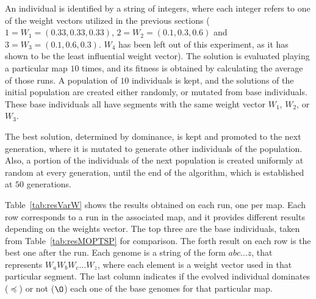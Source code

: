 \documentclass[journal]{IEEEtran}
\begin{document}
An individual is identified by a string of integers, where each integer refers to one of the weight vectors utilized in the previous sections ( $1 = W_1 = (0.33,0.33,0.33)$, $2 = W_2 = (0.1,0.3,0.6)$ and $3 = W_3 = (0.1,0.6,0.3)$. $W_4$ has been left out of this experiment, as it has shown to be the least influential weight vector). The solution is evaluated playing a particular map $10$ times, and its fitness is obtained by calculating the average of those runs. A population of $10$ individuals is kept, and the solutions of the initial population are created either randomly, or mutated from base individuals. These base individuals all have segments with the same weight vector $W_1$, $W_2$, or $W_3$. 

The best solution, determined by dominance, is kept and promoted to the next generation, where it is mutated to generate other individuals of the population. Also, a portion of the individuals of the next population is created uniformly at random at every generation, until the end of the algorithm, which is established at $50$ generations. 

Table~\ref{tab:resVarW} shows the results obtained on each run, one per map.  Each row corresponds to a run in the associated map, and it provides different results depending on the weights vector. The top three are the base individuals, taken from Table~\ref{tab:resMOPTSP} for comparison. The forth result on each row is the best one after the run. Each genome is a string of the form $abc \dots z$, that represents $W_aW_bW_c \dots W_z$, where each element is a weight vector used in that particular segment. The last column indicates if the evolved individual dominates ($\preceq$) or not ($\O$) each one of the base genomes for that particular map.
\end{document}
